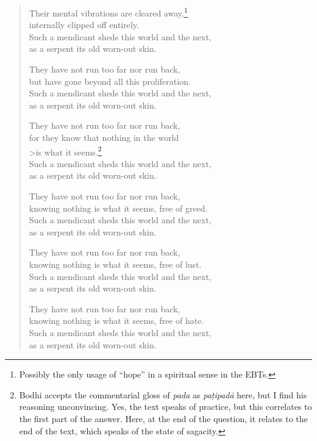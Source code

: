 \documentclass[12pt,openany]{book}%
\begin{document}
\begin{verse}
Their mental vibrations are cleared away,\footnote{Possibly the only usage of “hope” in a spiritual sense in the EBTs. } \\
internally clipped off entirely. \\
Such a mendicant sheds this world and the next, \\
as a serpent its old worn-out skin. 

They have not run too far nor run back, \\
but have gone beyond all this proliferation. \\
Such a mendicant sheds this world and the next, \\
as a serpent its old worn-out skin. 

They have not run too far nor run back, \\
for they know that nothing in the world \\>is what it seems.\footnote{Bodhi accepts the commentarial gloss of \textit{pada} as \textit{\textsanskrit{paṭipadā}} here, but I find his reasoning unconvincing. Yes, the text speaks of practice, but this correlates to the first part of the answer. Here, at the end of the question, it relates to the end of the text, which speaks of the state of sagacity. } \\
Such a mendicant sheds this world and the next, \\
as a serpent its old worn-out skin. 

They have not run too far nor run back, \\
knowing nothing is what it seems, free of greed. \\
Such a mendicant sheds this world and the next, \\
as a serpent its old worn-out skin. 

They have not run too far nor run back, \\
knowing nothing is what it seems, free of lust. \\
Such a mendicant sheds this world and the next, \\
as a serpent its old worn-out skin. 

They have not run too far nor run back, \\
knowing nothing is what it seems, free of hate. \\
Such a mendicant sheds this world and the next, \\
as a serpent its old worn-out skin. 


\end{verse}
\end{document}
